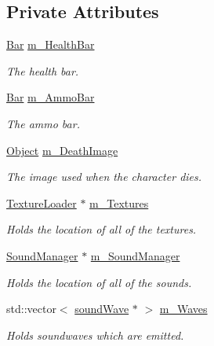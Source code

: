 \subsection*{Private Attributes}
\begin{DoxyCompactItemize}
\item 
\hyperlink{class_bar}{Bar} \hyperlink{class_character_ac04b03a0abdc6fe21f3326a98c788ecf}{m\+\_\+\+Health\+Bar}
\begin{DoxyCompactList}\small\item\em The health bar. \end{DoxyCompactList}\item 
\hyperlink{class_bar}{Bar} \hyperlink{class_character_a811000299dfe10b753c4065c7a7d16bb}{m\+\_\+\+Ammo\+Bar}
\begin{DoxyCompactList}\small\item\em The ammo bar. \end{DoxyCompactList}\item 
\hyperlink{class_object}{Object} \hyperlink{class_character_acf5fccc444e86f4c3d41557af8e2dd47}{m\+\_\+\+Death\+Image}
\begin{DoxyCompactList}\small\item\em The image used when the character dies. \end{DoxyCompactList}\item 
\hyperlink{class_texture_loader}{Texture\+Loader} $\ast$ \hyperlink{class_character_a8c925b6d9636faf2cf18b690b429e169}{m\+\_\+\+Textures}
\begin{DoxyCompactList}\small\item\em Holds the location of all of the textures. \end{DoxyCompactList}\item 
\hyperlink{class_sound_manager}{Sound\+Manager} $\ast$ \hyperlink{class_character_a531f612125a5fc1eb52cd0646d73fd75}{m\+\_\+\+Sound\+Manager}
\begin{DoxyCompactList}\small\item\em Holds the location of all of the sounds. \end{DoxyCompactList}\item 
std\+::vector$<$ \hyperlink{classsound_wave}{sound\+Wave} $\ast$ $>$ \hyperlink{class_character_a562e96e907ef9fca8684c2db67e1e738}{m\+\_\+\+Waves}
\begin{DoxyCompactList}\small\item\em Holds soundwaves which are emitted. \end{DoxyCompactList}\item 

\end{DoxyCompactItemize}
